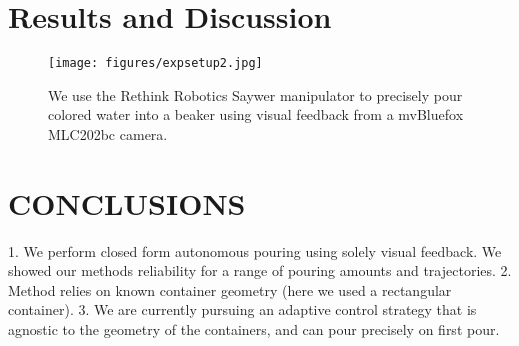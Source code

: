 \section{Results and Discussion}\label{sec:ResDis}
\begin{comment}
Outline: 
1. Show general experimental setup
2. *Present figure of accuracy of line detection vs Scale data (with stats between the two for 10 pours, collected off of later dataset): err between the two average and std_dev for 10 trials) (with camera sample at same hz, 5hz as scale)
3. Present Pouring Accuracy:
  a) Robustness to pouring time
  	i) 8sec trajectory pour (50, 100, 150ml) 
    ii) 10sec trajectory pour (50, 100, 150ml)
    iii) 12sec trajectory pour (50, 100, 150ml)
  b) General Repeatability and Statistics
  	i) 100ml, 10sec, 10-20 trials, presenting avg and 1std-deviation

4. Discussion 
  a) Reliability of vision to detect height (considerations e.g. placing closer, background importance/color detection) 
  b) Reliability of Pouring Model
  	i) behavior near singularities
    ii) reliance on constant hdot, mdot, x2  for feedback linearization, to overcome this we had small constant positive ang vel to compensate zero, or undetectable hdot. 
    iii) Requirement for model accuracy (knowing the dimensions of container), height above the pouring fluid: $x_1 = \sqrt{x_2^2 + 2g(s_0 - x1)}$ but for small pours these were determined to be negligible 
\end{comment}







\begin{figure}[ht]
    \centering
\texttt{[image: figures/expsetup2.jpg]}
    \caption{We use the Rethink Robotics Saywer manipulator to precisely pour colored water into a beaker using visual feedback from a mvBluefox MLC202bc camera.}
\label{fig:expsetup1}
\end{figure}




\section{CONCLUSIONS}

1.  We perform closed form autonomous pouring using solely visual feedback. We showed our methods reliability for a range of pouring amounts and trajectories. 
2. Method relies on known container geometry (here we used a rectangular container).
3. We are currently pursuing an adaptive control strategy that is  agnostic to the geometry of the containers, and can pour precisely on first pour.

